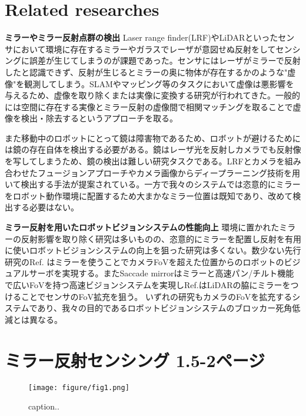 \documentclass[xelatex,ja=standard]{bxjsarticle}
\begin{document}
\section{Related researches}
\textbf{ミラーやミラー反射点群の検出}
Laser range finder(LRF)やLiDARといったセンサにおいて環境に存在するミラーやガラスでレーザが意図せぬ反射をしてセンシングに誤差が生じてしまうのが課題であった。センサにはレーザがミラーで反射したと認識できず、反射が生じるとミラーの奥に物体が存在するかのような"虚像"を観測してしまう。SLAMやマッピング等のタスクにおいて虚像は悪影響を与えるため、虚像を取り除くまたは実像に変換する研究が行われてきた\cite{Yang2008}\cite{Yang2011}\cite{Kim2016}\cite{Yun2018}\cite{Kashammer2015}。一般的には空間に存在する実像とミラー反射の虚像間で相関マッチングを取ることで虚像を検出・除去するというアプローチを取る。

また移動中のロボットにとって鏡は障害物であるため、ロボットが避けるためには鏡の存在自体を検出する必要がある。鏡はレーザ光を反射しカメラでも反射像を写してしまうため、鏡の検出は難しい研究タスクである\cite{Whelan2018}。LRFとカメラを組み合わせたフュージョンアプローチ\cite{Yang2008}やカメラ画像からディープラーニング技術を用いて検出する手法\cite{Yang2019}が提案されている。一方で我々のシステムでは恣意的にミラーをロボット動作環境に配置するため大まかなミラー位置は既知であり、改めて検出する必要はない。

\textbf{ミラー反射を用いたロボットビジョンシステムの性能向上}
環境に置かれたミラーの反射影響を取り除く研究は多いものの、恣意的にミラーを配置し反射を有用に使いロボットビジョンシステムの向上を狙った研究は多くない。数少ない先行研究のRef.\cite{kulpate2005eye} \cite{Marchand2017}はミラーを使うことでカメラFoVを超えた位置からのロボットのビジュアルサーボを実現する。またSaccade mirror\cite{okumura20151}はミラーと高速パン/チルト機能で広いFoVを持つ高速ビジョンシステムを実現しRef.\cite{Noguchi2012}はLiDARの脇にミラーをつけることでセンサのFoV拡充を狙う。
いずれの研究もカメラのFoVを拡充するシステムであり、我々の目的であるロボットビジョンシステムのブロッカー死角低減とは異なる。


\section{ミラー反射センシング 1.5-2ページ}

\begin{figure}[!]
\centering
  \texttt{[image: figure/fig1.png]}
  \caption{caption..}
  \label{fig-concept}
\end{figure}
\end{document}
